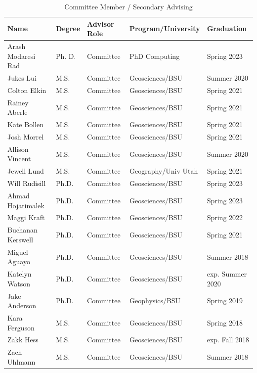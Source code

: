 \documentclass[11pt]{article}
\renewcommand\arraystretch{1}
\begin{document}
\begin{table}[!htbp]
\caption*{Committee Member / Secondary Advising}
\small
\renewcommand\arraystretch{0.7}
  \centering
  \begin{tabular}{|l|l|l|l|l|}
\hline
\textbf{Name} & \textbf{Degree} & \textbf{Advisor Role} & \textbf{Program/University} & \textbf{Graduation} \\ \hline \hline
Arash Modaresi Rad & Ph. D. & Committee & PhD Computing & Spring 2023 \\ \hline
Jukes Lui & M.S. & Committee & Geosciences/BSU & Summer 2020 \\ \hline
Colton Elkin & M.S. & Committee & Geosciences/BSU & Spring 2021 \\ \hline
Rainey Aberle & M.S. & Committee & Geosciences/BSU & Spring 2021 \\ \hline
Kate Bollen & M.S. & Committee & Geosciences/BSU & Spring 2021 \\ \hline
Josh Morrel & M.S. & Committee & Geosciences/BSU & Spring 2021 \\ \hline
Allison Vincent & M.S. & Committee & Geosciences/BSU & Summer 2020 \\ \hline
Jewell Lund & M.S. & Committee & Geography/Univ Utah & Spring 2021 \\ \hline
Will Rudisill & Ph.D. & Committee & Geosciences/BSU & Spring 2023 \\ \hline
Ahmad Hojatimalek & Ph.D. & Committee & Geosciences/BSU & Spring 2023 \\ \hline
Maggi Kraft & Ph.D. & Committee & Geosciences/BSU & Spring 2022 \\ \hline
Buchanan Kerswell & Ph.D. & Committee & Geosciences/BSU & Spring 2021 \\ \hline
Miguel Aguayo & Ph.D. & Committee & Geosciences/BSU & Summer 2018 \\ \hline
Katelyn Watson & Ph.D. & Committee & Geosciences/BSU & exp. Summer 2020 \\ \hline
Jake Anderson & Ph.D. & Committee & Geophysics/BSU & Spring 2019 \\ \hline
Kara Ferguson & M.S. & Committee & Geosciences/BSU & Spring 2018 \\ \hline
Zakk Hess & M.S. & Committee & Geosciences/BSU & exp. Fall 2018 \\ \hline
Zach Uhlmann & M.S. & Committee & Geosciences/BSU & Summer 2018 \\ \hline

\end{tabular}
\end{table}
\end{document}
